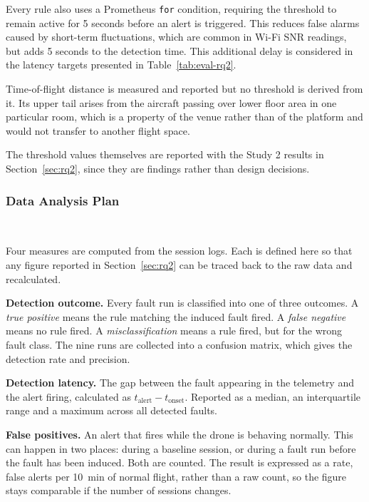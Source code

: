Every rule also uses a Prometheus \texttt{for} condition, requiring the
threshold to remain active for 5 seconds before an alert is triggered. This
reduces false alarms caused by short-term fluctuations, which are common in
Wi-Fi SNR readings, but adds 5 seconds to the detection time. This additional
delay is considered in the latency targets presented in
Table~\ref{tab:eval-rq2}.

Time-of-flight distance is measured and reported but no threshold is derived
from it. Its upper tail arises from the aircraft passing over lower floor area in
one particular room, which is a property of the venue rather than of the
platform and would not transfer to another flight space.

The threshold values themselves are reported with the Study 2 results in
Section~\ref{sec:rq2}, since they are findings rather than design decisions.

\subsubsection{Data Analysis Plan}~\label{subsec:method-analysis}

Four measures are computed from the session logs. Each is defined here so that
any figure reported in Section~\ref{sec:rq2} can be traced back to the raw data
and recalculated.

\vspace{0.5em}
\noindent\textbf{Detection outcome.} Every fault run is classified into one of
three outcomes. A \textit{true positive} means the rule matching the induced
fault fired. A \textit{false negative} means no rule fired. A
\textit{misclassification} means a rule fired, but for the wrong fault class.
The nine runs are collected into a confusion matrix, which gives the detection
rate and precision.

\vspace{0.5em}
\noindent\textbf{Detection latency.} The gap between the fault appearing in the
telemetry and the alert firing, calculated as
$t_{\text{alert}}-t_{\text{onset}}$. Reported as a median, an interquartile
range and a maximum across all detected faults.

\vspace{0.5em}
\noindent\textbf{False positives.} An alert that fires while the drone is
behaving normally. This can happen in two places: during a baseline session, or
during a fault run before the fault has been induced. Both are counted. The
result is expressed as a rate, false alerts per \SI{10}{\minute} of normal
flight, rather than a raw count, so the figure stays comparable if the number of
sessions changes.


